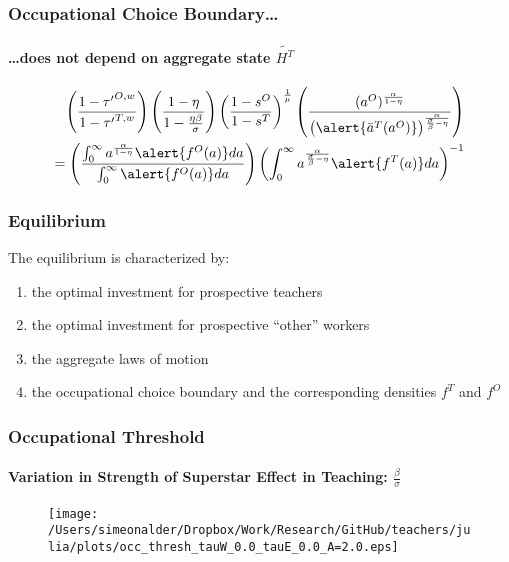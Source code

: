 \documentclass[11pt]{beamer}
\begin{document}

\begin{frame}
\frametitle{Occupational Choice Boundary\ldots}
\framesubtitle{\ldots does not depend on aggregate state $\widetilde{H^T}$} 
\begin{align}
\left(\frac{1-{\tau'}^{O,w}}{1-{\tau'}^{T,w}}\right) \left(\frac{1-\eta}{1-\tfrac{\eta\beta}{\sigma}}\right)  \left(\frac{1-s^{O}}{1-s^{T}}\right)^{\frac{1}{\mu}}  \left(\frac{(a^O)^\frac{\alpha}{1-\eta}}{\big(\alert{\bar{a}^T(a^O)}\big)^\frac{\alpha}{\frac{\sigma}{\beta}-\eta}} \right) \nonumber\\
= \left(\frac{\int_0^\infty a^\frac{\alpha}{1-\eta} \alert{f^O(a)} da}{\int_0^\infty \alert{f^O(a)} da} \right) \left(\int_0^\infty a^\frac{\alpha}{\frac{\sigma}{\beta}-\eta} \alert{f^T(a)} da\right)^{-1} \nonumber
\end{align}
\end{frame}

\begin{frame}
\frametitle{Equilibrium}
The equilibrium is characterized by:
\begin{enumerate}
  \item the optimal investment for prospective teachers 
  \item the optimal investment for prospective ``other'' workers
  \item the aggregate laws of motion
  \item the occupational choice boundary and the corresponding densities $f^T$ and $f^O$
\end{enumerate}
\end{frame}

\begin{frame}
\frametitle{Occupational Threshold}
\framesubtitle{Variation in Strength of Superstar Effect in Teaching: $\frac{\beta}{\sigma}$}
\begin{figure}
\begin{center}
\texttt{[image: /Users/simeonalder/Dropbox/Work/Research/GitHub/teachers/julia/plots/occ\_thresh\_tauW\_0.0\_tauE\_0.0\_A=2.0.eps]}
\end{center}
\end{figure}
\end{frame}
\end{document}
